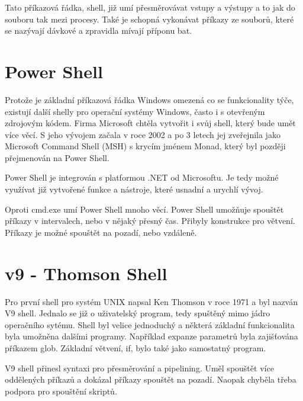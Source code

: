 \documentclass[thesis=M,czech]{FITthesis}[2012/06/26]
\begin{document}
Tato příkazová řádka, shell, již umí přesměrovávat vstupy a výstupy a to jak do souboru tak mezi procesy. Také je schopná vykonávat příkazy ze souborů, které se nazývají dávkové a zpravidla mívají příponu bat.



\section{Power Shell}

Protože je základní příkazová řádka Windows omezená co se funkcionality týče, existují další shelly pro operační systémy Windows, často i s otevřeným zdrojovým kódem. Firma Microsoft chtěla vytvořit i svůj shell, který bude umět více věcí. S jeho vývojem začala v roce 2002 a po 3 letech jej zveřejnila jako Microsoft Command Shell (MSH) s krycím jménem Monad, který byl později přejmenován na Power Shell.

Power Shell je integrován s platformou .NET od Microsoftu. Je tedy možné využívat již vytvořené funkce a nástroje, které usnadní a urychlí vývoj.

Oproti cmd.exe umí Power Shell mnoho věcí. Power Shell umožňuje spouštět příkazy v intervalech, nebo v nějaký přesný čas. Přibyly konstrukce pro větvení. Příkazy je možné spouštět na pozadí, nebo vzdáleně.




\section{v9 - Thomson Shell}

Pro první shell pro systém UNIX napsal Ken Thomson v roce 1971 a byl nazván V9 shell. Jednalo se již o uživatelský program, tedy spuštěný mimo jádro operačního sytému. Shell byl velice jednoduchý a některá základní funkcionalita byla umožněna dalšími programy. Například expanze parametrů byla zajišťována příkazem glob. Základní větvení, if, bylo také jako samostatný program.

V9 shell přinesl syntaxi pro přesměrování a pipelining. Uměl spouštět více oddělených příkazů a dokázal příkazy spouštět na pozadí. Naopak chyběla třeba podpora pro spouštění skriptů. 
\end{document}
